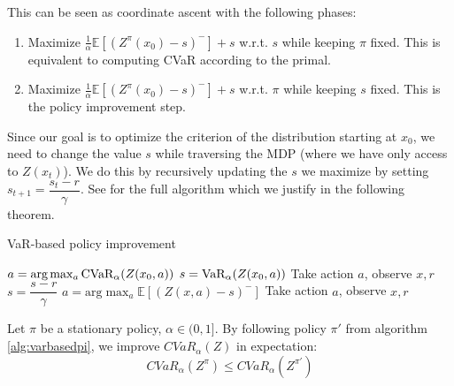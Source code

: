 This can be seen as coordinate ascent with the following phases:
\begin{enumerate}
\item Maximize $\frac{1}{\alpha}\mathbb{E}\left[ (Z^\pi(x_0)-s)^-\right] + s$ w.r.t. $s$ while keeping $\pi$ fixed. This is equivalent to computing CVaR according to the primal.
\item Maximize $\frac{1}{\alpha}\mathbb{E}\left[ (Z^\pi(x_0)-s)^-\right] + s$ w.r.t. $\pi$ while keeping $s$ fixed. This is the policy improvement step.
\end{enumerate}
Since our goal is to optimize the criterion of the distribution starting at $x_0$, we need to change the value $s$ while traversing the MDP (where we have only access to $Z(x_t)$). We do this by recursively updating the $s$ we maximize by setting $s_{t+1} = \dfrac{s_t - r}{\gamma}$. See  for the full algorithm which we justify in the following theorem.

\begin{algorithm}
\caption{VaR-based policy improvement}
\label{alg:varbasedpi}
\begin{algorithmic}
    \STATE $a = \text{arg}\max_a \text{CVaR}_\alpha(Z(x_0, a))$
    \STATE $s = \text{VaR}_\alpha(Z(x_0, a))$
    \STATE Take action $a$, observe $x, r$
    	\STATE $s = \dfrac{s-r}{\gamma}$
    	\STATE $a = \text{arg}\max_a \mathbb{E}\left[(Z(x, a)-s)^- \right]$
    	\STATE Take action $a$, observe $x, r$
   	\ENDWHILE
\end{algorithmic}
\end{algorithm}

\begin{theorem}
Let $\pi$ be a stationary policy, $\alpha \in (0, 1]$. 
By following policy $\pi'$ from algorithm \ref{alg:varbasedpi}, we improve $CVaR_\alpha(Z)$ in expectation:
$$CVaR_\alpha(Z^\pi) \le CVaR_\alpha(Z^{\pi'})$$
%
%

\end{theorem}

